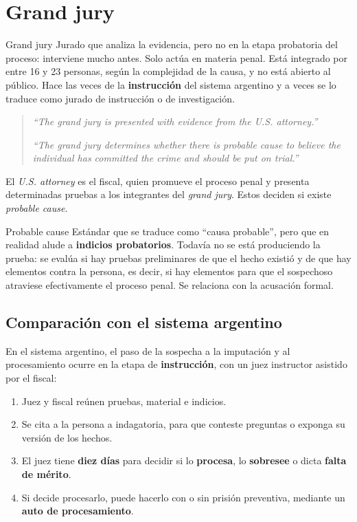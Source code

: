 \documentclass[12pt,oneside]{book}
\begin{document}
\section{Grand jury}

\begin{definition}{Grand jury}
Jurado que analiza la evidencia, pero no en la etapa probatoria del proceso: interviene mucho antes. Solo actúa en materia penal. Está integrado por entre 16 y 23 personas, según la complejidad de la causa, y no está abierto al público. Hace las veces de la \textbf{instrucción} del sistema argentino y a veces se lo traduce como jurado de instrucción o de investigación.
\end{definition}

\begin{quote}
\textit{``The grand jury is presented with evidence from the U.S. attorney.''}

\textit{``The grand jury determines whether there is probable cause to believe the individual has committed the crime and should be put on trial.''}
\end{quote}

El \textit{U.S. attorney} es el fiscal, quien promueve el proceso penal y presenta determinadas pruebas a los integrantes del \textit{grand jury}. Estos deciden si existe \textit{probable cause}.

\begin{definition}{Probable cause}
Estándar que se traduce como ``causa probable'', pero que en realidad alude a \textbf{indicios probatorios}. Todavía no se está produciendo la prueba: se evalúa si hay pruebas preliminares de que el hecho existió y de que hay elementos contra la persona, es decir, si hay elementos para que el sospechoso atraviese efectivamente el proceso penal. Se relaciona con la acusación formal.
\end{definition}

\subsection{Comparación con el sistema argentino}

En el sistema argentino, el paso de la sospecha a la imputación y al procesamiento ocurre en la etapa de \textbf{instrucción}, con un juez instructor asistido por el fiscal:
\begin{enumerate}
\item Juez y fiscal reúnen pruebas, material e indicios.
\item Se cita a la persona a indagatoria, para que conteste preguntas o exponga su versión de los hechos.
\item El juez tiene \textbf{diez días} para decidir si lo \textbf{procesa}, lo \textbf{sobresee} o dicta \textbf{falta de mérito}.
\item Si decide procesarlo, puede hacerlo con o sin prisión preventiva, mediante un \textbf{auto de procesamiento}.
\end{enumerate}
\end{document}

